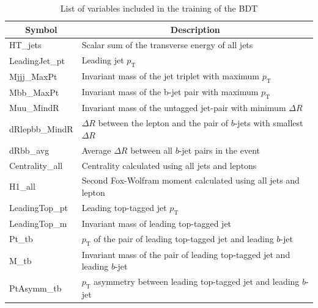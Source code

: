 \begin{description}
    \begin{table}[H]
      \centering
      \begin{tabular*}{150mm}{@{\extracolsep{\fill}}ll}
        \hline
        \multicolumn{1}{c}{Symbol} & \multicolumn{1}{c}{Description}\\
        \hline\hline
        HT\_jets                                   & Scalar sum of the transverse energy of all jets\\
        LeadingJet\_pt                             & Leading jet $p_\text{T}$\\
        Mjjj\_MaxPt                                & Invariant mass of the jet triplet with maximum $p_\text{T}$\\
        Mbb\_MaxPt                                 & Invariant mass of the b-jet pair with maximum $p_\text{T}$\\
        Muu\_MindR                                 & Invariant mass of the untagged jet-pair with minimum $\Delta{R}$\\
        dRlepbb\_MindR                             & $\Delta{R}$ between the lepton and the pair of $b$-jets with smallest $\Delta{R}$\\
        dRbb\_avg                                  & Average $\Delta{R}$ between all $b$-jet pairs in the event\\
        Centrality\_all                            & Centrality calculated using all jets and leptons\\
        H1\_all                                    & Second Fox-Wolfram moment calculated using all jets and lepton\\
        LeadingTop\_pt                             & Leading top-tagged jet $p_\text{T}$\\
        LeadingTop\_m                              & Invariant mass of leading top-tagged jet \\
        Pt\_tb                                     & $p_\text{T}$ of the pair of leading top-tagged jet and leading $b$-jet\\
        M\_tb                                      & Invariant mass of the pair of leading top-tagged jet and leading $b$-jet\\
        PtAsymm\_tb                                & $p_\text{T}$ asymmetry between leading top-tagged jet and leading $b$-jet\\
        \hline
      \end{tabular*}
      \caption{List of variables included in the training of the BDT}
      \label{tab:BDTInputVariables}
    \end{table}


\end{description}

